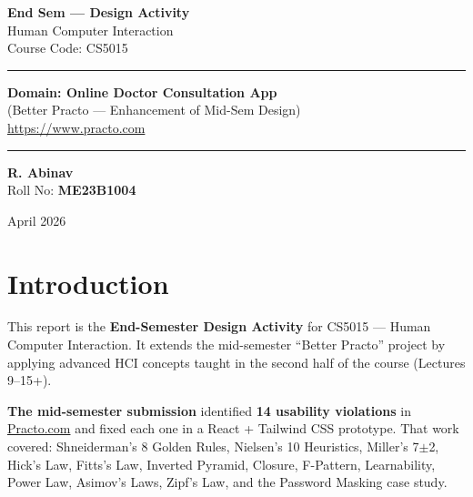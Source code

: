 \documentclass[12pt, a4paper]{article}
\begin{document}
\begin{titlepage}
\centering
\vspace*{2cm}

{\Huge\bfseries\color{primary} End Sem --- Design Activity}\\[0.8cm]
{\LARGE\color{primary!70!black} Human Computer Interaction}\\[0.3cm]
{\large Course Code: CS5015}

\vspace{1.5cm}

\rule{\textwidth}{1pt}
\vspace{0.5cm}

{\Large\bfseries Domain: Online Doctor Consultation App}\\[0.3cm]
{\large (Better Practo --- Enhancement of Mid-Sem Design)}\\[0.2cm]
{\large\url{https://www.practo.com}}

\vspace{0.5cm}
\rule{\textwidth}{1pt}

\vspace{2cm}

{\Large\bfseries R. Abinav}\\[0.3cm]
{\large Roll No: \textbf{ME23B1004}}

\vspace{2cm}

\vfill
{\small April 2026}
\end{titlepage}

\tableofcontents
\newpage

\section{Introduction}

This report is the \textbf{End-Semester Design Activity} for CS5015 --- Human Computer Interaction. It extends the mid-semester ``Better Practo'' project by applying advanced HCI concepts taught in the second half of the course (Lectures 9--15+).

\textbf{The mid-semester submission} identified \textbf{14 usability violations} in \href{https://www.practo.com}{Practo.com} and fixed each one in a React + Tailwind CSS prototype. That work covered: Shneiderman's 8 Golden Rules, Nielsen's 10 Heuristics, Miller's 7$\pm$2, Hick's Law, Fitts's Law, Inverted Pyramid, Closure, F-Pattern, Learnability, Power Law, Asimov's Laws, Zipf's Law, and the Password Masking case study.
\end{document}
